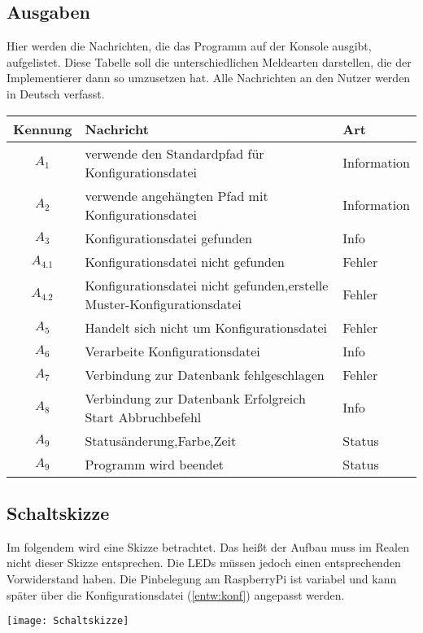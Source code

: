 \documentclass{scrartcl}
\begin{document}
\subsection{Ausgaben}
\label{entw:ausg}
	Hier werden die Nachrichten, die das Programm auf der Konsole ausgibt, aufgelistet. Diese Tabelle soll die unterschiedlichen Meldearten darstellen, die der Implementierer dann so umzusetzen hat. Alle Nachrichten an den Nutzer werden in Deutsch verfasst. 
\begin{center}
	\begin{tabular}{ | C{.2} | L{.5} | L{.25} | }
	\hline
	Kennung & Nachricht	& Art \\ \hline\hline
	$A_{1}$	& verwende den Standardpfad für Konfigurationsdatei	& Information	\\ \hline
	$A_{2}$	& verwende angehängten Pfad mit Konfigurationsdatei	& Information	\\ \hline
	$A_{3}$	& Konfigurationsdatei gefunden	& Info	\\ \hline
	$A_{4.1}$	& Konfigurationsdatei nicht gefunden	& Fehler	\\ \hline
	$A_{4.2}$	& Konfigurationsdatei nicht gefunden,erstelle Muster-Konfigurationsdatei	& Fehler	\\ \hline
	$A_{5}$	& Handelt sich nicht um Konfigurationsdatei	& Fehler	\\ \hline
	$A_{6}$	& Verarbeite Konfigurationsdatei	& Info	\\ \hline
	$A_{7}$	& Verbindung zur Datenbank fehlgeschlagen	& Fehler 	\\ \hline
	$A_{8}$	& Verbindung zur Datenbank	Erfolgreich  Start Abbruchbefehl	& Info	\\ \hline
	$A_{9}$	& Statusänderung,Farbe,Zeit	& Status	\\ \hline
	$A_{9}$	& Programm wird beendet	& Status	\\ \hline	
\end{tabular}
\end{center}

\newpage
\subsection{Schaltskizze}
Im folgendem wird eine Skizze betrachtet. Das  heißt der Aufbau muss im Realen nicht dieser Skizze entsprechen. Die LEDs müssen jedoch einen entsprechenden Vorwiderstand haben. Die Pinbelegung am RaspberryPi ist variabel und kann später über die Konfigurationsdatei (\autoref{entw:konf}) angepasst werden.
\label{entw:schltsk}
\begin{center}
\texttt{[image: Schaltskizze]}
\end{center}
\end{document}
